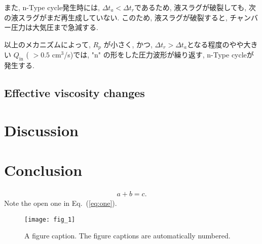 \documentclass[aps,pre,preprint,groupedaddress,showkeys]{revtex4-2}
\begin{document}
また, n-Type cycle発生時には, $\Delta t_a < \Delta t_r$であるため, 液スラグが破裂しても, 次の液スラグがまだ再生成していない. このため, 液スラグが破裂すると, チャンバー圧力は大気圧まで急減する. 

以上のメカニズムによって, $R_p$ が小さく, かつ, $\Delta t_r >\Delta t_a$となる程度のやや大きい $Q_\mathrm{in}$ ( $> 0.5 $ cm$^3$/s)では, "n" の形をした圧力波形が繰り返す, n-Type cycleが発生する. 







\subsection{Effective viscosity changes}

\section{Discussion}\label{mec}

\section{Conclusion}\label{con}


\begin{eqnarray}
a+b=c
\label{eq:one}.
\end{eqnarray}
Note the open one in Eq.~(\ref{eq:one}).

\begin{figure}
\texttt{[image: fig\_1]}%
\caption{\label{fig:epsart} A figure caption. The figure captions are automatically numbered.}
\end{figure}



%
\end{document}
